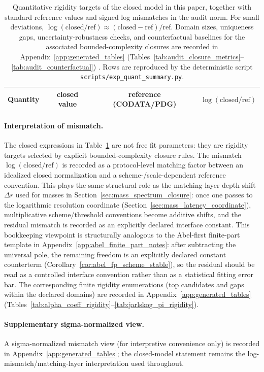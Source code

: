\begin{table}[t]
\centering
\small
\setlength{\tabcolsep}{6pt}
\renewcommand{\arraystretch}{1.15}
\begin{tabular}{lccc}
\toprule
Quantity & closed value & reference (CODATA/PDG) & $\log(\mathrm{closed}/\mathrm{ref})$ \\
\midrule
%
\end{tabular}
\caption{Quantitative rigidity targets of the closed model in this paper, together with standard reference values and signed log mismatches in the audit norm. For small deviations, $\log(\mathrm{closed}/\mathrm{ref})\approx (\mathrm{closed}-\mathrm{ref})/\mathrm{ref}$. Domain sizes, uniqueness gaps, uncertainty-robustness checks, and counterfactual baselines for the associated bounded-complexity closures are recorded in Appendix~\ref{app:generated_tables} (Tables~\ref{tab:audit_closure_metrics}--\ref{tab:audit_counterfactual}) \cite{PDGRPP2024,CODATA2022RMP}. Rows are reproduced by the deterministic script \texttt{scripts/exp\_quant\_summary.py}.}
\label{tab:quant_summary}
\end{table}

\paragraph{Interpretation of mismatch.}
The closed expressions in Table~\ref{tab:quant_summary} are not free fit parameters: they are rigidity targets selected by explicit bounded-complexity closure rules.
The mismatch $\log(\mathrm{closed}/\mathrm{ref})$ is recorded as a protocol-level matching factor between an idealized closed normalization and a scheme-/scale-dependent reference convention.
This plays the same structural role as the matching-layer depth shift $\Delta r$ used for masses in Section~\ref{sec:mass_spectrum_closure}: once one passes to the logarithmic resolution coordinate (Section~\ref{sec:mass_latency_coordinate}), multiplicative scheme/threshold conventions become additive shifts, and the residual mismatch is recorded as an explicitly declared interface constant.
\AuditTag This bookkeeping viewpoint is structurally analogous to the Abel-first finite-part template in Appendix~\ref{app:abel_finite_part_notes}: after subtracting the universal pole, the remaining freedom is an explicitly declared constant counterterm (Corollary~\ref{cor:abel_fp_scheme_stable}), so the residual should be read as a controlled interface convention rather than as a statistical fitting error bar.
The corresponding finite rigidity enumerations (top candidates and gaps within the declared domains) are recorded in Appendix~\ref{app:generated_tables} (Tables~\ref{tab:alpha_coeff_rigidity}--\ref{tab:jarlskog_pi_rigidity}).




\paragraph{Supplementary sigma-normalized view.}
\AuditTag A sigma-normalized mismatch view (for interpretive convenience only) is recorded in Appendix~\ref{app:generated_tables}; the closed-model statement remains the log-mismatch/matching-layer interpretation used throughout.



